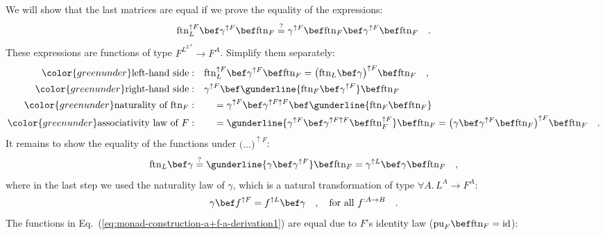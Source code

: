 We will show that the last matrices are equal if we prove the equality
of the expressions:
\[
\text{ftn}_{L}^{\uparrow F}\bef\gamma^{\uparrow F}\bef\text{ftn}_{F}\overset{?}{=}\gamma^{\uparrow F}\bef\text{ftn}_{F}\bef\gamma^{\uparrow F}\bef\text{ftn}_{F}\quad.
\]
These expressions are functions of type $F^{L^{L^{A}}}\rightarrow F^{A}$.
Simplify them separately:
\begin{align*}
{\color{greenunder}\text{left-hand side}:}\quad & \text{ftn}_{L}^{\uparrow F}\bef\gamma^{\uparrow F}\bef\text{ftn}_{F}=\big(\text{ftn}_{L}\bef\gamma\big)^{\uparrow F}\bef\text{ftn}_{F}\quad,\\
{\color{greenunder}\text{right-hand side}:}\quad & \gamma^{\uparrow F}\bef\gunderline{\text{ftn}_{F}\bef\gamma^{\uparrow F}}\bef\text{ftn}_{F}\\
{\color{greenunder}\text{naturality of }\text{ftn}_{F}:}\quad & \quad=\gamma^{\uparrow F}\bef\gamma^{\uparrow F\uparrow F}\bef\gunderline{\text{ftn}_{F}\bef\text{ftn}_{F}}\\
{\color{greenunder}\text{associativity law of }F:}\quad & \quad=\gunderline{\gamma^{\uparrow F}\bef\gamma^{\uparrow F\uparrow F}\bef\text{ftn}_{F}^{\uparrow F}}\bef\text{ftn}_{F}=\big(\gamma\bef\gamma^{\uparrow F}\bef\text{ftn}_{F}\big)^{\uparrow F}\bef\text{ftn}_{F}\quad.
\end{align*}
It remains to show the equality of the functions under $\big(...\big)^{\uparrow F}$:
\begin{equation}
\text{ftn}_{L}\bef\gamma\overset{?}{=}\gunderline{\gamma\bef\gamma^{\uparrow F}}\bef\text{ftn}_{F}=\gamma^{\uparrow L}\bef\gamma\bef\text{ftn}_{F}\quad,\label{eq:monad-construction-a+f-a-derivation1}
\end{equation}
where in the last step we used the naturality law of $\gamma$, which
is a natural transformation of type $\forall A.\,L^{A}\rightarrow F^{A}$:
\[
\gamma\bef f^{\uparrow F}=f^{\uparrow L}\bef\gamma\quad,\quad\text{for all }f^{:A\rightarrow B}\quad.
\]
The functions in Eq.~(\ref{eq:monad-construction-a+f-a-derivation1})
are equal due to $F$\textsf{'}s identity law ($\text{pu}_{F}\bef\text{ftn}_{F}=\text{id}$):
